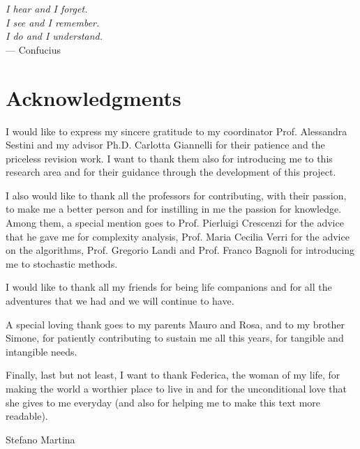 
\begin{flushright}{
    \slshape
    I hear and I forget.\\
    I see and I remember.\\
    I do and I understand.} \\ \medskip
    --- Confucius
\end{flushright}

\bigskip

\begingroup
\let\clearpage\relax
\let\cleardoublepage\relax
\let\cleardoublepage\relax
\chapter*{Acknowledgments}
I would like to express my sincere gratitude to my coordinator
Prof. Alessandra Sestini and my advisor 
Ph.D. Carlotta Giannelli for their patience and the priceless revision
work. I want to thank them also for introducing me to this research
area and for their guidance through the development of this project.

I also would like to thank all the professors for contributing, with
their passion, to make me a better person and for instilling in me the
passion for knowledge. Among them, a special mention goes to
Prof. Pierluigi Crescenzi for the advice that he gave me for
complexity analysis, Prof. Maria Cecilia Verri for the advice on the
algorithms, Prof. Gregorio Landi and Prof. Franco Bagnoli for
introducing me to stochastic methods.

I would like to thank all my friends for being life companions and for
all the adventures that we had and we will continue to have.

A special loving thank goes to my parents Mauro and Rosa, and to my
brother Simone, for patiently 
contributing to sustain me all this years, for tangible and
intangible needs.

Finally, last but not least, I want to thank
Federica, the woman of my life, for making the world a worthier place
to live in 
and for the 
unconditional love that she gives to me everyday (and also for
helping me to make this text more readable).

\begin{flushright}{\calligra
Stefano Martina}
\end{flushright}
\endgroup




